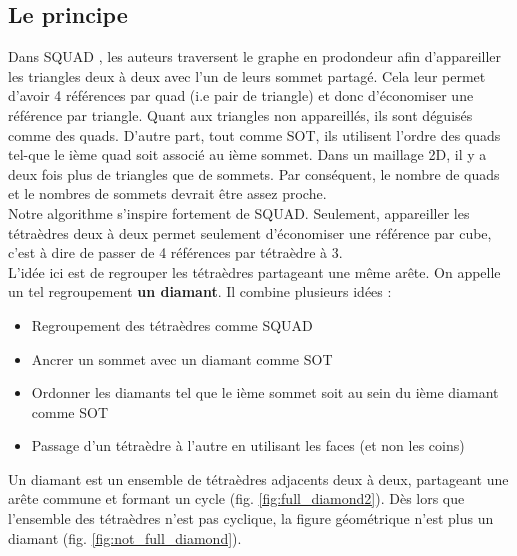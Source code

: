 \documentclass[a4paper,11pt,openany]{article}
\begin{document}
\subsection{Le principe}
\noindent
Dans SQUAD \cite{squad}, les auteurs traversent le graphe en prodondeur afin d'appareiller les triangles deux à deux avec l'un de leurs sommet partagé. Cela leur permet d'avoir 4 références par quad (i.e pair de triangle) et donc d'économiser une référence par triangle. Quant aux triangles non appareillés, ils sont déguisés comme des quads. D'autre part, tout comme SOT, ils utilisent l'ordre des quads tel-que le ième quad soit associé au ième sommet. Dans un maillage 2D, il y a deux fois plus de triangles que de sommets. Par conséquent, le nombre de quads et le nombres de sommets devrait être assez proche.\\
Notre algorithme s'inspire fortement de SQUAD. Seulement, appareiller les tétraèdres deux à deux permet seulement d'économiser une référence par cube, c'est à dire de passer de 4 références par tétraèdre à 3.\\
L'idée ici est de regrouper les tétraèdres partageant une même arête. On appelle un tel regroupement \textbf{un diamant}. Il combine plusieurs idées :
\begin{itemize}
\item Regroupement des tétraèdres comme SQUAD
\item Ancrer un sommet avec un diamant comme SOT
\item Ordonner les diamants tel que le ième sommet soit au sein du ième diamant comme SOT
\item Passage d'un tétraèdre à l'autre en utilisant les faces (et non les coins)
\end{itemize}
Un diamant est un ensemble de tétraèdres adjacents deux à deux, partageant une arête commune et formant un cycle (fig. \ref{fig:full_diamond2}). Dès lors que l'ensemble des tétraèdres n'est pas cyclique, la figure géométrique n'est plus un diamant (fig. \ref{fig:not_full_diamond}). 
\end{document}
